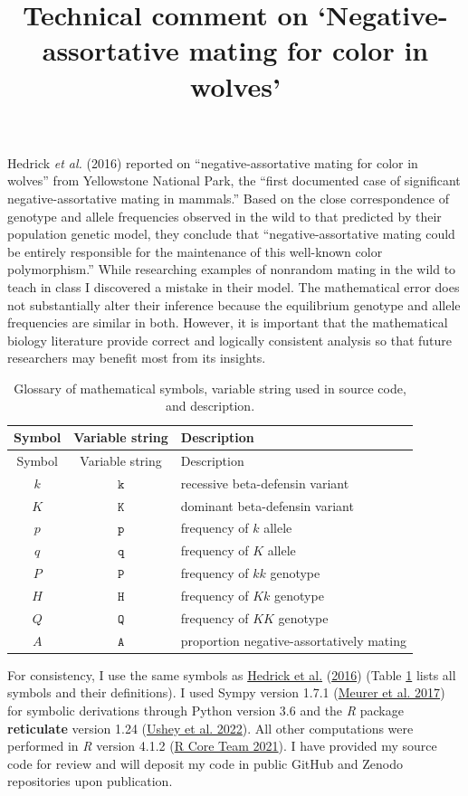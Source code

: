 \documentclass[
]{article}
\title{Technical comment on `Negative-assortative mating for color in wolves'}
\author{}
\date{\vspace{-2.5em}}
\begin{document}
\maketitle

Hedrick \emph{et al.} (2016) reported on ``negative-assortative mating for color in wolves'' from Yellowstone National Park, the ``first documented case of significant negative-assortative mating in mammals.'' Based on the close correspondence of genotype and allele frequencies observed in the wild to that predicted by their population genetic model, they conclude that ``negative-assortative mating could be entirely responsible for the maintenance of this well-known color polymorphism.'' While researching examples of nonrandom mating in the wild to teach in class I discovered a mistake in their model. The mathematical error does not substantially alter their inference because the equilibrium genotype and allele frequencies are similar in both. However, it is important that the mathematical biology literature provide correct and logically consistent analysis so that future researchers may benefit most from its insights.

\begin{longtable}[]{@{}ccl@{}}
\caption{\label{tab:symbols}Glossary of mathematical symbols, variable string used in source code, and description.}\tabularnewline
\toprule
Symbol & Variable string & Description \\
\midrule
\endfirsthead
\toprule
Symbol & Variable string & Description \\
\midrule
\endhead
\(k\) & \(\mathtt{k}\) & recessive beta-defensin variant \\
\(K\) & \(\mathtt{K}\) & dominant beta-defensin variant \\
\(p\) & \(\mathtt{p}\) & frequency of \(k\) allele \\
\(q\) & \(\mathtt{q}\) & frequency of \(K\) allele \\
\(P\) & \(\mathtt{P}\) & frequency of \(kk\) genotype \\
\(H\) & \(\mathtt{H}\) & frequency of \(Kk\) genotype \\
\(Q\) & \(\mathtt{Q}\) & frequency of \(KK\) genotype \\
\(A\) & \(\mathtt{A}\) & proportion negative-assortatively mating \\
\bottomrule
\end{longtable}

For consistency, I use the same symbols as \protect\hyperlink{ref-hedrick_negative-assortative_2016}{Hedrick et al.} (\protect\hyperlink{ref-hedrick_negative-assortative_2016}{2016}) (Table \ref{tab:symbols} lists all symbols and their definitions). I used Sympy version 1.7.1 (\protect\hyperlink{ref-meurer_sympy:_2017}{Meurer et al. 2017}) for symbolic derivations through Python version 3.6 and the \emph{R} package \textbf{reticulate} version 1.24 (\protect\hyperlink{ref-ushey_reticulate_2022}{Ushey et al. 2022}). All other computations were performed in \emph{R} version 4.1.2 (\protect\hyperlink{ref-r_core_team_r_2021}{R Core Team 2021}). I have provided my source code for review and will deposit my code in public GitHub and Zenodo repositories upon publication.
\end{document}
